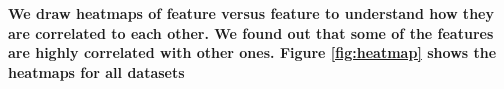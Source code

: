 \documentclass{article}
\begin{document}
\textbf{We draw heatmaps of feature versus feature to understand how they are correlated to each other. We found out that some of the features are highly correlated with other ones. Figure \ref{fig:heatmap} shows the heatmaps for all datasets}

\begin{figure}%
\centering
{}%
\hspace{8pt}%
 \\
\subfigure[c]{%
\label{fig:ex3-c}%
}
\end{figure}
\end{document}
